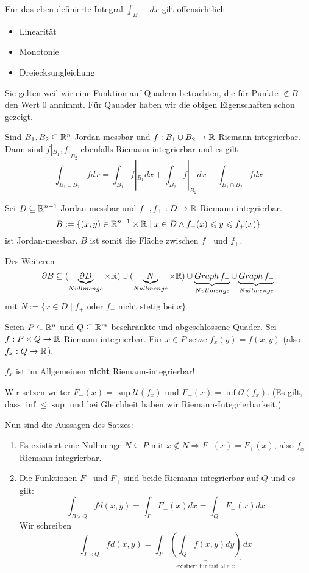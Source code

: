 \documentclass[main.tex]{subfiles}
\begin{document}
\begin{Theorem}
  Für das eben definierte Integral $\int_B - dx$ gilt offensichtlich
  \begin{itemize}
    \item Linearität
    \item Monotonie
    \item Dreiecksungleichung
  \end{itemize}
  Sie gelten weil wir eine Funktion auf Quadern betrachten, die für Punkte $\notin B$ den Wert $0$ annimmt. Für Qauader haben wir die obigen Eigenschaften schon gezeigt.
\end{Theorem}

\begin{Theorem}
  Sind $B_1, B_2 \subseteq \mathbb{R}^n$ Jordan-messbar und $f: B_1 \cup B_2 \to \mathbb{R}$ Riemann-integrierbar. Dann sind $f|_{B_1},f|_{B_2}$ ebenfalls Riemann-integrierbar und es gilt
  $$\int_{B_1 \cup B_2} f dx = \int_{B_1} f|_{B_1} dx + \int_{B_2} f|_{B_2} dx - \int_{B_1 \cap B_2} f dx$$
\end{Theorem}

\begin{Theorem}
  Sei $D \subseteq \mathbb{R}^{n-1}$ Jordan-messbar und $f_-,f_+ : D \to \mathbb{R}$ Riemann-integrierbar.
  $$B := \{(x,y) \in \mathbb{R}^{n-1} \times \mathbb{R} \mid x \in D \land f_-(x) \leqslant y \leqslant f_+(x)\}$$
  ist Jordan-messbar.
  $B$ ist somit die Fläche zwischen $f_-$ und $f_+$.

  Des Weiteren
  $$\partial B \subseteq (\underbrace{\partial D}_{Nullmenge} \times \mathbb{R}) \cup (\underbrace{N}_{Nullmenge} \times \mathbb{R}) \cup \underbrace{Graph \, f_+}_{Nullmenge} \cup \underbrace{Graph \, f_-}_{Nullmenge}$$
  mit $N := \{x \in D \mid f_+ \text{ oder }f_- \text{ nicht stetig bei } x\}$
\end{Theorem}

\begin{Theorem}
  Seien $P \subseteq \mathbb{R}^n$ und $Q \subseteq \mathbb{R}^m$ beschränkte und abgeschlossene Quader. Sei $f: P \times Q \to \mathbb{R}$ Riemann-integrierbar. Für $x \in P$ setze $f_x(y) = f(x,y)$ (also $f_x: Q \to \mathbb{R}$).
  \begin{Bemerkung}[Warnung]
    $f_x$ ist im Allgemeinen \textbf{nicht} Riemann-integrierbar!
  \end{Bemerkung}
  Wir setzen weiter $F_-(x) = \sup \mathcal{U}(f_x)$ und $F_+(x) = \inf \mathcal{O}(f_x)$. (Es gilt, dass $\inf \leq \sup$ und bei Gleichheit haben wir Riemann-Integrierbarkeit.)

  Nun sind die Aussagen des Satzes:
  \begin{enumerate}
    \item Es existiert eine Nullmenge $N \subseteq P$ mit $x \notin N \Rightarrow F_-(x) = F_+(x)$, also $f_x$ Riemann-integrierbar.
    \item Die Funktionen $F_-$ und $F_+$ sind beide Riemann-integrierbar auf $Q$ und es gilt:
      $$\int_{B\times Q} f d(x,y) = \int_P F_-(x)dx = \int_Q F_+(x) dx$$
      Wir schreiben
      $$\int_{P \times Q} f d(x,y) = \int_P \underbrace{\left(\int_Q f(x,y) dy \right)}_{\text{existiert für fast alle }x}\, dx$$
  \end{enumerate}
\end{Theorem}
\end{document}
